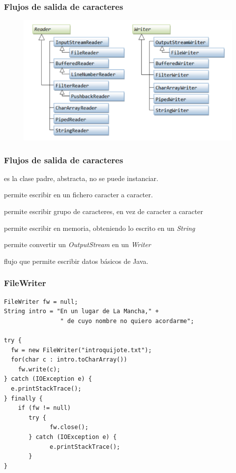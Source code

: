 \documentclass{beamer}
\begin{document}
\begin{frame}
\frametitle{Flujos de salida de caracteres}
\begin{figure}
\includegraphics[scale=0.5]{imagenes/rw.png}
\end{figure}
\end{frame}


\begin{frame}[fragile]
\frametitle{Flujos de salida de caracteres}
\begin{description}[<+->]
\item[Writer] es la clase padre, abstracta, no se puede instanciar.
\item[FileWriter] permite escribir en un fichero caracter a caracter.
\item[BufferedWriter] permite escribir grupo de caracteres, en vez de caracter a caracter
\item[StringWriter] permite escribir en memoria, obteniendo lo escrito en un \emph{String}
\item[OutputStreamWriter] permite convertir un \emph{OutputStream} en un \emph{Writer}
\item[PrintWriter] flujo que permite escribir datos básicos de Java.
\end{description}
\pause
\end{frame}

\begin{frame}[fragile]
\frametitle{FileWriter}
\begin{verbatim}
FileWriter fw = null;
String intro = "En un lugar de La Mancha," +
                " de cuyo nombre no quiero acordarme";

try {
  fw = new FileWriter("introquijote.txt");
  for(char c : intro.toCharArray())
    fw.write(c);
} catch (IOException e) {
  e.printStackTrace();
} finally {
    if (fw != null)
       try {
             fw.close();
       } catch (IOException e) {
             e.printStackTrace();
       }
}
\end{verbatim}
\end{frame}
\end{document}
